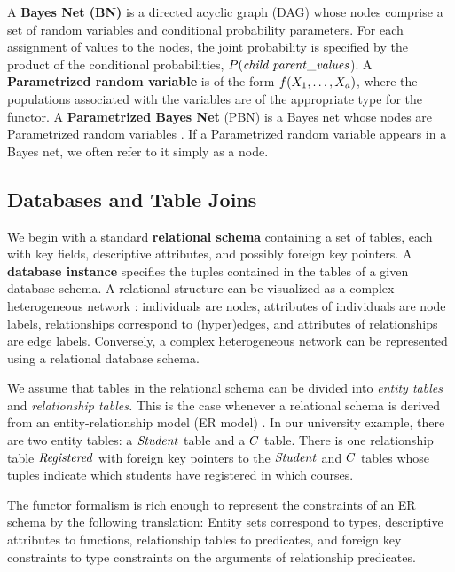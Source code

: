 \documentclass{article}
\begin{document}
A {\bf Bayes Net (BN)} is a directed acyclic graph (DAG) whose nodes comprise a set of random variables and conditional probability parameters.
For each assignment of values to the nodes, the joint probability 
is specified by the product of the conditional probabilities, $P(\it{child}|\it{parent\_values}$). 
A \textbf{Parametrized random variable} is of the form $f(X_{1},\ldots,X_{a})$, where the populations associated with the variables are of the appropriate type for the functor. A \textbf{Parametrized Bayes Net} (PBN) is a Bayes net whose nodes are Parametrized random variables \cite{Poole2003}. If a Parametrized random variable appears in a Bayes net, we often refer to it simply as a node. 

\subsection{Databases and Table Joins}
 
 We begin with a standard \textbf{relational schema} containing a set of tables, each with key fields, %
descriptive attributes, and possibly foreign key pointers. A \textbf{database instance} specifies the tuples contained in the tables of a given database schema. 
A relational structure can be visualized as a complex heterogeneous network \cite[Ch.8.2.1]{Russell2010}: individuals are nodes, attributes of individuals are node labels, relationships correspond to (hyper)edges, and attributes of relationships are edge labels. Conversely, a complex heterogeneous network can be represented using a relational database schema.

We assume that tables in the relational schema can be divided into {\em entity tables} and {\em relationship tables.} This is the case whenever a relational schema is derived from an entity-relationship model (ER model) \cite[Ch.2.2]{Ullman1982}. 
In our university example, there are two entity tables: a $\mathit{Student}$ table and a $C$ table.  There is one relationship table $\mathit{Registered}$ with foreign key pointers to the $\mathit{Student}$ and $C$ tables whose tuples indicate which students have registered in which courses. 

The functor formalism is rich enough to represent the constraints of an ER schema by the following translation: Entity sets correspond to types, descriptive attributes to functions, relationship tables to predicates, and foreign key constraints to type constraints on the arguments of relationship predicates.  
 
\end{document}
